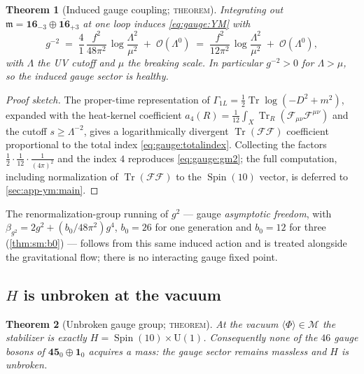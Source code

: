 \documentclass[11pt]{article}
\theoremstyle{plain}
\newtheorem{theorem}{Theorem}[section]
\theoremstyle{definition}
\theoremstyle{remark}
\newcommand{\U}[1]{\mathrm{U}(#1)}
\newcommand{\Spin}{\operatorname{Spin}}
\newcommand{\Tr}{\operatorname{Tr}}
\newcommand{\Uone}{\U{1}}
\begin{document}
\begin{theorem}[Induced gauge coupling; \textsc{theorem}]\label{thm:gauge:coupling}
Integrating out $\mathfrak m=\mathbf{16}_{-3}\oplus\overline{\mathbf{16}}_{+3}$
at one loop induces \eqref{eq:gauge:YM} with
\begin{equation}\label{eq:gauge:gm2}
  g^{-2}
  \;=\;
  \frac{4}{1}\,\frac{f^{2}}{48\pi^{2}}\,
  \log\!\frac{\Lambda^{2}}{\mu^{2}}
  \;+\;\mathcal O(\Lambda^{0})
  \;=\;
  \frac{f^{2}}{12\pi^{2}}\,\log\!\frac{\Lambda^{2}}{\mu^{2}}
  \;+\;\mathcal O(\Lambda^{0}),
\end{equation}
with $\Lambda$ the UV cutoff and $\mu$ the breaking scale. In particular
$g^{-2}>0$ for $\Lambda>\mu$, so the induced gauge sector is healthy.
\end{theorem}

\begin{proof}[Proof sketch]
The proper-time representation of $\Gamma_{1L}=\tfrac12\Tr\log(-D^2+m^2)$,
expanded with the heat-kernel coefficient
$a_4(R)=\tfrac{1}{12}\int_X\Tr_R(\mathcal F_{\mu\nu}\mathcal F^{\mu\nu})$
and the cutoff $s\ge\Lambda^{-2}$, gives a logarithmically divergent
$\Tr(\mathcal F\mathcal F)$ coefficient proportional to the total index
\eqref{eq:gauge:totalindex}. Collecting the factors $\tfrac12\cdot\tfrac1{12}\cdot\tfrac1{(4\pi)^2}$
and the index $4$ reproduces \eqref{eq:gauge:gm2}; the full computation,
including normalization of $\Tr(\mathcal F\mathcal F)$ to the
$\Spin(10)$ vector, is deferred to \autoref{sec:app-ym:main}.
\end{proof}

The renormalization-group running of $g^{2}$ --- gauge \emph{asymptotic
freedom}, with $\beta_{g^2}=2g^2+(b_0/48\pi^2)g^4$, $b_0=26$ for one
generation and $b_0=12$ for three (\autoref{thm:sm:b0}) --- follows
from this same induced action and is treated alongside the gravitational
flow; there is no interacting gauge fixed point.

\subsection{$H$ is unbroken at the vacuum}
\label{sec:gauge:unbroken}

\begin{theorem}[Unbroken gauge group; \textsc{theorem}]\label{thm:gauge:unbroken}
At the vacuum $\langle\Phi\rangle\in\mathcal M$ the stabilizer is exactly
$H=\Spin(10)\times\Uone$. Consequently none of the $46$ gauge bosons of
$\mathbf{45}_{0}\oplus\mathbf 1_{0}$ acquires a mass: the gauge sector
remains massless and $H$ is unbroken.
\end{theorem}
\end{document}
